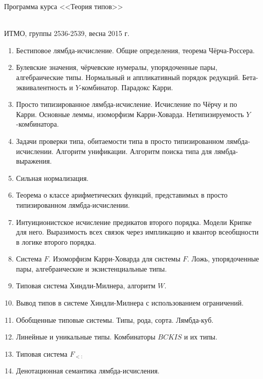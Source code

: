 \documentclass[12pt,a4paper,oneside]{book}
\begin{document}
\begin{center}
\begin{Large}Программа курса <<Теория типов>>\end{Large}\\
ИТМО, группы 2536-2539, весна 2015 г.
\end{center}

\begin{enumerate}
\item Бестиповое лямбда-исчисление. Общие определения, теорема Чёрча-Россера.
\item Булевские значения, чёрчевские нумералы, упорядоченные пары, 
алгебраические типы. Нормальный и аппликативный порядок редукций.
Бета-эквивалентность и $Y$-комбинатор. Парадокс Карри.
\item Просто типизированное лямбда-исчисление. Исчисление по Чёрчу и по Карри.
Основные леммы, изоморфизм Карри-Ховарда. Нетипизируемость $Y$-комбинатора.
\item Задачи проверки типа, обитаемости типа в просто типизированном лямбда-исчислении.
Алгоритм унификации. Алгоритм поиска типа для лямбда-выражения.
\item Сильная нормализация.
\item Теорема о классе арифметических функций, представимых в просто типизированном лямбда-исчислении.
\item Интуиционистское исчисление предикатов второго порядка. Модели Крипке для него.
Выразимость всех связок через импликацию и квантор всеобщности в логике второго порядка.
\item Система $F$. Изоморфизм Карри-Ховарда для системы $F$.
Ложь, упорядоченные пары, алгебраические и экзистенциальные типы.
\item Типовая система Хиндли-Милнера, алгоритм $W$.
\item Вывод типов в системе Хиндли-Милнера с использованием ограничений.
\item Обобщенные типовые системы. Типы, рода, сорта. Лямбда-куб.
\item Линейные и уникальные типы. Комбинаторы $BCKIS$ и их типы.
\item Типовая система $F_{<:}$
\item Денотационная семантика лямбда-исчисления.
\end{enumerate}
\end{document}
